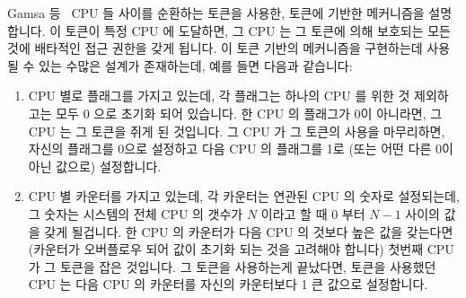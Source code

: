 Gamsa 등~\cite[Section 5.3]{Gamsa99} CPU 들 사이를 순환하는 토큰을 사용한,
토큰에 기반한 메커니즘을 설명합니다.
이 토큰이 특정 CPU 에 도달하면, 그 CPU 는 그 토큰에 의해 보호되는 모든 것에
배타적인 접근 권한을 갖게 됩니다.
이 토큰 기반의 메커니즘을 구현하는데 사용될 수 있는 수많은 설계가 존재하는데,
예를 들면 다음과 같습니다:

\begin{enumerate}
\item	CPU 별로 플래그를 가지고 있는데, 각 플래그는 하나의 CPU 를 위한 것
	제외하고는 모두 0 으로 초기화 되어 있습니다.
	한 CPU 의 플래그가 0이 아니라면, 그 CPU 는 그 토큰을 쥐게 된 것입니다.
	그 CPU 가 그 토큰의 사용을 마무리하면, 자신의 플래그를 0으로 설정하고
	다음 CPU 의 플래그를 1로 (또는 어떤 다른 0이 아닌 값으로) 설정합니다.
\item	CPU 별 카운터를 가지고 있는데, 각 카운터는 연관된 CPU 의 숫자로
	설정되는데, 그 숫자는 시스템의 전체 CPU 의 갯수가 $N$ 이라고 할 때 0
	부터 $N-1$ 사이의 값을 갖게 될겁니다.
	한 CPU 의 카운터가 다음 CPU 의 것보다 높은 값을 갖는다면 (카운터가
	오버플로우 되어 값이 초기화 되는 것을 고려해야 합니다) 첫번째 CPU 가 그
	토큰을 잡은 것입니다.
	그 토큰을 사용하는게 끝났다면, 토큰을 사용했던 CPU 는 다음 CPU 의
	카운터를 자신의 카운터보다 1 큰 값으로 설정합니다.

\end{enumerate}

